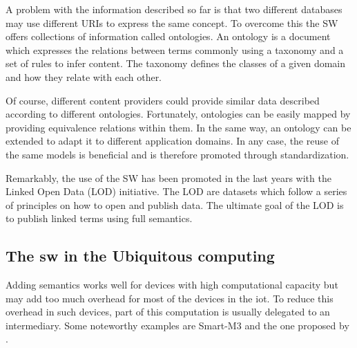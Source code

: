

A problem with the information described so far is that two different databases may use different URIs to express the same concept.
To overcome this the SW offers collections of information called ontologies.
An ontology is a document which expresses the relations between terms commonly using a taxonomy and a set of rules to infer content.
The taxonomy defines the classes of a given domain and how they relate with each other.

Of course, different content providers could provide similar data described according to different ontologies.
Fortunately, ontologies can be easily mapped by providing equivalence relations within them.
In the same way, an ontology can be extended to adapt it to different application domains.
In any case, the reuse of the same models is beneficial and is therefore promoted through standardization.

Remarkably, the use of the SW has been promoted in the last years with the Linked Open Data (LOD) initiative.
The LOD are datasets which follow a series of principles on how to open and publish data.
The ultimate goal of the LOD is to publish linked terms using full semantics.




\subsection{The \acl{sw} in the Ubiquitous computing}




Adding semantics works well for devices with high computational capacity but may add too much overhead for most of the devices in the \ac{iot}.
To reduce this overhead in such devices, part of this computation is usually delegated to an intermediary.
Some noteworthy examples are Smart-M3 \citep{honkola_smart-m3_2010} and the one proposed by \citet{broring_semantic_2009}.


